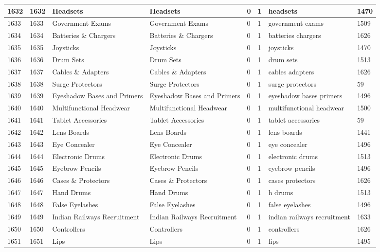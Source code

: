 \begin{longtable}{|l|l|l|l|l|l|l|l|}
1632 & 1632 & Headsets & Headsets & 0 & 1 & headsets & 1470 \\ \hline 
1633 & 1633 & Government Exams & Government Exams & 0 & 1 & government exams & 1509 \\ \hline 
1634 & 1634 & Batteries \& Chargers & Batteries \& Chargers & 0 & 1 & batteries chargers & 1626 \\ \hline 
1635 & 1635 & Joysticks & Joysticks & 0 & 1 & joysticks & 1470 \\ \hline 
1636 & 1636 & Drum Sets & Drum Sets & 0 & 1 & drum sets & 1513 \\ \hline 
1637 & 1637 & Cables \& Adapters & Cables \& Adapters & 0 & 1 & cables adapters & 1626 \\ \hline 
1638 & 1638 & Surge Protectors & Surge Protectors & 0 & 1 & surge protectors & 59 \\ \hline 
1639 & 1639 & Eyeshadow Bases and Primers & Eyeshadow Bases and Primers & 0 & 1 & eyeshadow bases primers & 1496 \\ \hline 
1640 & 1640 & Multifunctional Headwear & Multifunctional Headwear & 0 & 1 & multifunctional headwear & 1500 \\ \hline 
1641 & 1641 & Tablet Accessories & Tablet Accessories & 0 & 1 & tablet accessories & 59 \\ \hline 
1642 & 1642 & Lens Boards & Lens Boards & 0 & 1 & lens boards & 1441 \\ \hline 
1643 & 1643 & Eye Concealer & Eye Concealer & 0 & 1 & eye concealer & 1496 \\ \hline 
1644 & 1644 & Electronic Drums & Electronic Drums & 0 & 1 & electronic drums & 1513 \\ \hline 
1645 & 1645 & Eyebrow Pencils & Eyebrow Pencils & 0 & 1 & eyebrow pencils & 1496 \\ \hline 
1646 & 1646 & Cases \& Protectors & Cases \& Protectors & 0 & 1 & cases protectors & 1626 \\ \hline 
1647 & 1647 & Hand Drums & Hand Drums & 0 & 1 & h drums & 1513 \\ \hline 
1648 & 1648 & False Eyelashes & False Eyelashes & 0 & 1 & false eyelashes & 1496 \\ \hline 
1649 & 1649 & Indian Railways Recruitment & Indian Railways Recruitment & 0 & 1 & indian railways recruitment & 1633 \\ \hline 
1650 & 1650 & Controllers & Controllers & 0 & 1 & controllers & 1626 \\ \hline 
1651 & 1651 & Lips & Lips & 0 & 1 & lips & 1495 \\ \hline 

\end{longtable}
